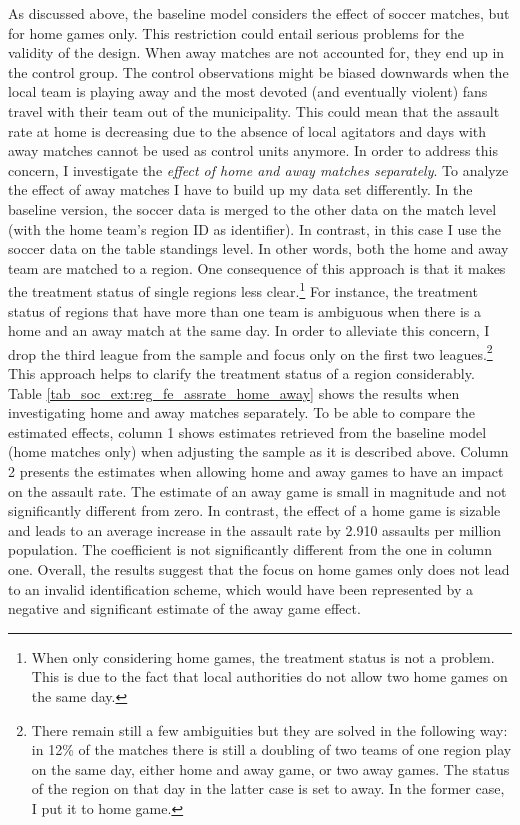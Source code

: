 \documentclass[11pt, a4paper]{article} %
\begin{document}
As discussed above, the baseline model considers the effect of soccer matches, but for home games only. This restriction could entail serious problems for the validity of the design. When away matches are not accounted for, they end up in the control group. The control observations might be biased downwards when the local team is playing away and the most devoted (and eventually violent) fans travel with their team out of the municipality. This could mean that the assault rate at home is decreasing due to the absence of local agitators and days with away matches cannot be used as control units anymore. In order to address this concern, I investigate the \textit{effect of home and away matches separately}. To analyze the effect of away matches I have to build up my data set differently. In the baseline version, the soccer data is merged to the other data on the match level (with the home team's region ID as identifier). In contrast, in this case I use the soccer data on the table standings level. In other words, both the home and away team are matched to a region. One consequence of this approach is that it makes the treatment status of single regions less clear.\footnote{When only considering home games, the treatment status is not a problem. This is due to the fact that local authorities do not allow two home games on the same day.} For instance, the treatment status of regions that have more than one team is ambiguous when there is a home and an away match at the same day. In order to alleviate this concern, I drop the third league from the sample and focus only on the first two leagues.\footnote{There remain still a few ambiguities but they are solved in the following way: in 12\% of the matches there is still a doubling of two teams of one region play on the same day, either home and away game, or two away games. The status of the region on that day in the latter case is set to away. In the former case, I put it to home game.} This approach helps to clarify the treatment status of a region considerably. Table \ref{tab_soc_ext:reg_fe_assrate_home_away} shows the results when investigating home and away matches separately. To be able to compare the estimated effects, column 1 shows estimates retrieved from the baseline model (home matches only) when adjusting the sample as it is described above. Column 2 presents the estimates when allowing home and away games to have an impact on the assault rate. The estimate of an away game is small in magnitude and not significantly different from zero. In contrast, the effect of a home game is sizable and leads to an average increase in the assault rate by 2.910 assaults per million population. The coefficient is not significantly different from the one in column one. Overall, the results suggest that the focus on home games only does not lead to an invalid identification scheme, which would have been represented by a negative and significant estimate of the away game effect. 
\end{document}

